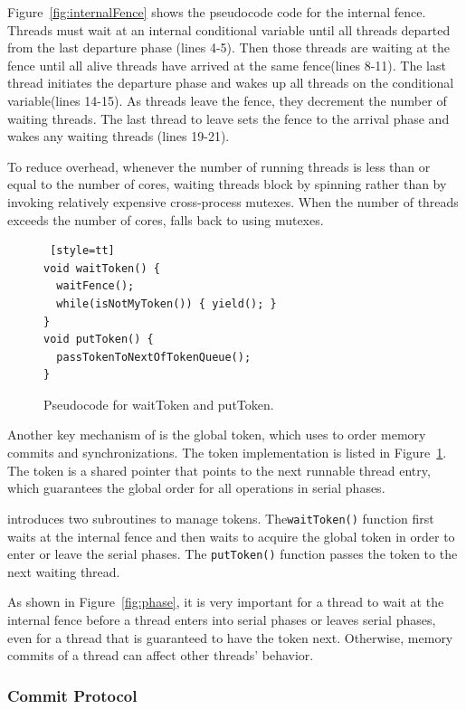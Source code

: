 Figure~\ref{fig:internalFence} shows the pseudocode code for the internal fence. Threads must wait at an internal conditional variable until all threads departed from the last departure phase (lines 4-5). Then those threads are waiting at the fence until all alive threads have arrived at the same fence(lines 8-11). The last thread initiates the departure phase and wakes up all threads on the conditional variable(lines 14-15). As threads leave the fence, they decrement the number of waiting threads.  The last thread to leave sets the fence to the arrival phase and wakes any waiting threads (lines 19-21).

To reduce overhead, whenever the number of running threads is
less than or equal to the number of cores, waiting threads block by spinning rather than by invoking relatively expensive cross-process \pthreads{} mutexes. When the number of threads exceeds the number of cores, \dthreads{} falls back to using \pthreads{} mutexes.

\begin{figure}
\begin{lstlisting} [style=tt]
void waitToken() {
  waitFence();
  while(isNotMyToken()) { yield(); }
}
void putToken() {
  passTokenToNextOfTokenQueue();
}
\end{lstlisting}
\caption{Pseudocode for waitToken and putToken. 
\label{fig:token}}
\end{figure}

Another key mechanism of \dthreads{} is the global token, which \dthreads{} uses to order memory commits and synchronizations. The token implementation is listed in Figure~\ref{fig:token}. The token is a shared pointer that points to the next runnable thread entry, which guarantees the global order for all operations in serial phases.  

\dthreads{} introduces two subroutines to manage tokens.  The\texttt{waitToken()} function first waits at the internal fence and then waits to acquire the global token in order to enter or leave the serial phases. The \texttt{putToken()} function passes the token to the next waiting thread. 

As shown in Figure~\ref{fig:phase}, it is very important for a thread to wait at the internal fence before a thread enters into serial phases or leaves serial phases, even for a thread that is guaranteed to have the token next. Otherwise, memory commits of a thread can affect other threads' behavior. 

\subsubsection{Commit Protocol}

